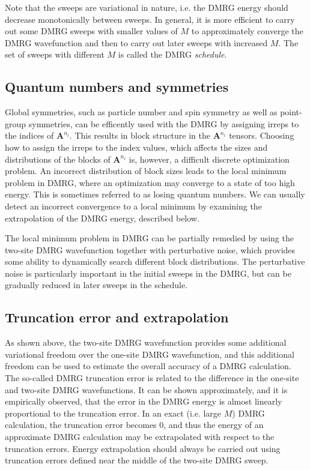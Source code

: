 \documentclass[letterpaper,12pt,aps, pra]{revtex4-1}
\begin{document}
Note that the sweeps are variational in nature, i.e. the DMRG energy should decrease monotonically between sweeps.
In general, it is more efficient to carry out some DMRG sweeps with smaller values of $M$ to approximately
converge the DMRG wavefunction and then to carry out later sweeps with increased $M$. The set of sweeps with different $M$ is
called the DMRG {\it schedule}.

\subsection{Quantum numbers and symmetries} \label{sec:convergence1}

Global symmetries, such as particle number and spin symmetry as well as
point-group symmetries, can be efficently used with the DMRG by assigning irreps
to the indices of $\mathbf{A}^{n_i}$. This results in block
structure in the $\mathbf{A}^{n_i}$ tensors. Choosing how to assign the irreps
to the index values, which affects the sizes and distributions of the blocks of $\mathbf{A}^{n_i}$
is, however,  a difficult  discrete optimization problem. An incorrect distribution 
of block sizes leads to the local minimum problem in DMRG, where an optimization may converge to a state
of too high energy. This is sometimes referred to as losing quantum numbers. 
We can usually detect an incorrect
convergence to a local minimum by examining the extrapolation of the DMRG energy, described below.

The local minimum problem in DMRG can be partially remedied by using the two-site DMRG wavefunction
together with perturbative noise, which provides some ability
to dynamically search different block distributions. The perturbative noise is particularly important
in the initial sweeps in the DMRG, but can be gradually reduced 
in later sweeps in the schedule.


\subsection{Truncation error and extrapolation}\label{sec:convergence2}

As shown above, the two-site DMRG wavefunction provides some additional
variational freedom over the one-site DMRG wavefunction, and this additional freedom
can be used to estimate the overall accuracy of a DMRG calculation. The so-called DMRG truncation
error is related to the difference in the one-site and two-site DMRG wavefunctions. 
 It can be shown approximately, and it is empirically observed,
that the error in the DMRG energy is almost linearly proportional to the truncation error. 
In an exact
(i.e. large $M$) DMRG calculation, the truncation error becomes 0, and thus
the energy of an approximate DMRG calculation may be  extrapolated with respect to the truncation errors. %
Energy extrapolation should always be carried out using truncation errors defined near the middle of the two-site DMRG sweep.
\end{document}
